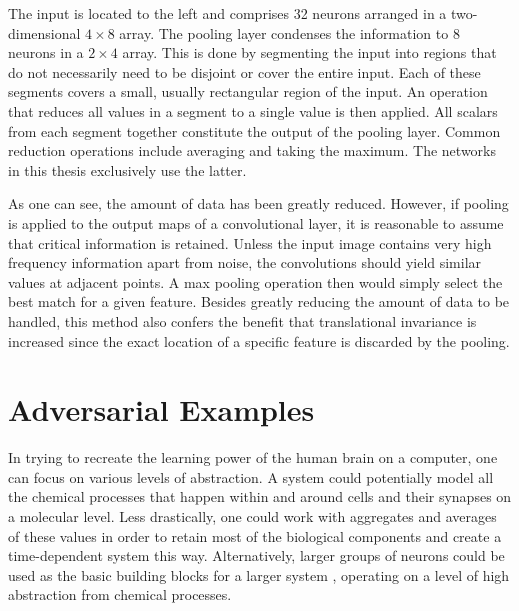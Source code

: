 \documentclass[11pt, a4paper]{article}
\begin{document}
The input is located to the left and comprises 32 neurons arranged in a two-dimensional $4 \times 8$ array. The pooling layer condenses the information to 8 neurons in a $2 \times 4$ array. This is done by segmenting the input into regions that do not necessarily need to be disjoint or cover the entire input. Each of these segments covers a small, usually rectangular region of the input. An operation that reduces all values in a segment to a single value is then applied. All scalars from each segment together constitute the output of the pooling layer. Common reduction operations include averaging and taking the maximum. The networks in this thesis exclusively use the latter.

As one can see, the amount of data has been greatly reduced. However, if pooling is applied to the output maps of a convolutional layer, it is reasonable to assume that critical information is retained. Unless the input image contains very high frequency information apart from noise, the convolutions should yield similar values at adjacent points. A max pooling operation then would simply select the best match for a given feature. Besides greatly reducing the amount of data to be handled, this method also confers the benefit that translational invariance is increased since the exact location of a specific feature is discarded by the pooling.












\section{Adversarial Examples}
\label{sec:adversarial-examples}

In trying to recreate the learning power of the human brain on a computer, one can focus on various levels of abstraction. A system could potentially model all the chemical processes that happen within and around cells and their synapses on a molecular level. Less drastically, one could work with aggregates and averages of these values in order to retain most of the biological components and create a time-dependent system this way. Alternatively, larger groups of neurons could be used as the basic building blocks for a larger system \cite{dynamic-field-theory-movement-preparation}, operating on a level of high abstraction from chemical processes.
\end{document}
